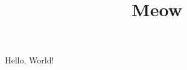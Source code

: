 \documentclass{article}
\begin{document}
\title{Meow}

Hello, World!

\cite{LAK132}

\newpage



\end{document}
